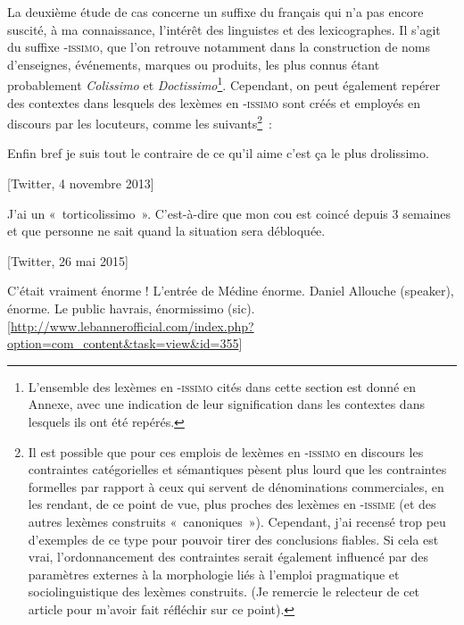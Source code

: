 \documentclass[output=paper]{langsci/langscibook}
\begin{document}
La deuxième étude de cas concerne un suffixe du français qui n'a pas
encore suscité, à ma connaissance, l'intérêt des linguistes et des
lexicographes. Il s'agit du suffixe -\textsc{issimo}, que l'on retrouve
notamment dans la construction de noms d'enseignes, événements, marques
ou produits, les plus connus étant probablement \emph{Colissimo} et
\emph{Doctissimo}\footnote{L'ensemble des lexèmes en -\textsc{issimo}
  cités dans cette section est donné en Annexe, avec une indication de
  leur signification dans les contextes dans lesquels ils ont été
  repérés.}. Cependant, on peut également repérer des contextes dans
lesquels des lexèmes en ‑\textsc{issimo} sont créés et employés en
discours par les locuteurs, comme les suivants\footnote{Il est possible
  que pour ces emplois de lexèmes en -\textsc{issimo} en discours les
  contraintes catégorielles et sémantiques pèsent plus lourd que les
  contraintes formelles par rapport à ceux qui servent de dénominations
  commerciales, en les rendant, de ce point de vue, plus proches des
  lexèmes en -\textsc{issime} (et des autres lexèmes construits
  «~canoniques~»). Cependant, j'ai recensé trop peu d'exemples de ce type
  pour pouvoir tirer des conclusions fiables. Si cela est vrai,
  l'ordonnancement des contraintes serait également influencé par des
  paramètres externes à la morphologie liés à l'emploi pragmatique et
  sociolinguistique des lexèmes construits. (Je remercie le relecteur de
  cet article pour m'avoir fait réfléchir sur ce point).}~:

  \ea\label{ex:montermini:10}

  \ea\label{ex:montermini:10a}
Enfin bref je suis tout le contraire de ce qu'il aime c'est ça le plus
drolissimo.

{[}Twitter, 4 novembre 2013{]}

\ex\label{ex:montermini:10b}
J'ai un «~torticolissimo~». C'est-à-dire que mon cou est coincé depuis 3
semaines et que personne ne sait quand la situation sera débloquée.

{[}Twitter, 26 mai 2015{]}

\ex\label{ex:montermini:10c} C'était vraiment énorme ! L'entrée de Médine énorme. Daniel Allouche
(speaker), énorme. Le public havrais, énormissimo (sic).
[\url{http://www.lebannerofficial.com/index.php?option=com_content&task=view&id=355}]
\z\z
\end{document}
